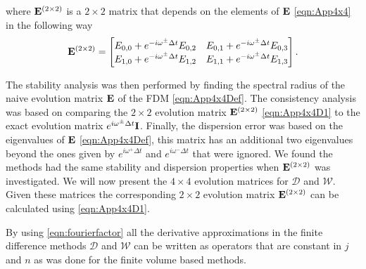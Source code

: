where $\mathbf{E}^{\left(2 \times 2\right)}$ is a $2 \times 2$ matrix that depends on the elements of $\mathbf{E}$ \eqref{eqn:App4x4} in the following way
\begin{equation}
\label{eqn:App4x4D1}
\mathbf{E}^{\left(2 \times 2\right)} = \begin{bmatrix}E_{0,0} + e^{-i \omega^{\pm }\Delta t} E_{0,2} & E_{0,1} + e^{-i \omega^{\pm }\Delta t} E_{0,3} \\
E_{1,0} + e^{-i \omega^{\pm }\Delta t} E_{1,2} & E_{1,1} + e^{-i \omega^{\pm }\Delta t} E_{1,3} \\
\end{bmatrix}.
\end{equation}

The stability analysis was then performed by finding the spectral radius of the naive evolution matrix $\mathbf{E}$ of the FDM \eqref{eqn:App4x4Def}. The consistency analysis was based on comparing the $2\times2$ evolution matrix $\mathbf{E}^{\left(2 \times 2\right)}$ \eqref{eqn:App4x4D1} to the exact evolution matrix $e^{i \omega^\pm \Delta t}\mathbf{I} $. Finally, the dispersion error was based on the eigenvalues of $\mathbf{E}$ \eqref{eqn:App4x4Def}, this matrix has an additional two eigenvalues beyond the ones given by $e^{i \omega^+ \Delta t}$ and $e^{i \omega^- \Delta t}$ that were ignored. We found the methods had the same stability and dispersion properties when $\mathbf{E}^{\left(2 \times 2\right)}$ was investigated. We will now present the $4\times4$ evolution matrices for $\mathcal{D}$ and $\mathcal{W}$. Given these matrices the corresponding $2\times 2$ evolution matrix $\mathbf{E}^{\left(2 \times 2\right)}$ can be calculated using \eqref{eqn:App4x4D1}.



By using \eqref{eqn:fourierfactor} all the derivative approximations in the finite difference methods $\mathcal{D}$ and $\mathcal{W}$ can be written as operators that are constant in $j$ and $n$ as was done for the finite volume based methods.

